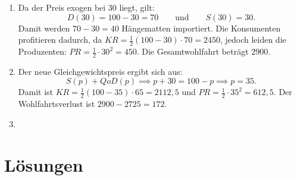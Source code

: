 \begin{solution}
	\begin{enumerate}
		\item Da der Preis exogen bei $30$ liegt, gilt:
		      \[
			      D(30) = 100-30 = 70 \qquad \text{und} \qquad S(30) = 30
			      .\]
		      Damit werden $70-30 = 40$ Hängematten importiert.
		      Die Konsumenten profitieren dadurch, da $KR = \frac{1}{2} (100-30) \cdot 70 = 2450$, jedoch leiden die Produzenten: $PR= \frac{1}{2} \cdot 30^2 = 450$.
		      Die Gesamtwohlfahrt beträgt $2900$.
		\item Der neue Gleichgewichtspreis ergibt sich aus:
		      \[
			      S(p) + Q o D(p) \implies p+30 = 100-p \implies p = 35
			      .\]
		      Damit ist $KR= \frac{1}{2} (100-35) \cdot 65 = 2112,5$ und $PR= \frac{1}{2} \cdot 35^2 = 612,5$.
		      Der Wohlfahrtsverlust ist $2900-2725 = 172$.
		\item
	\end{enumerate}

\end{solution}

\clearpage
\section{Lösungen}

\printsolutions
